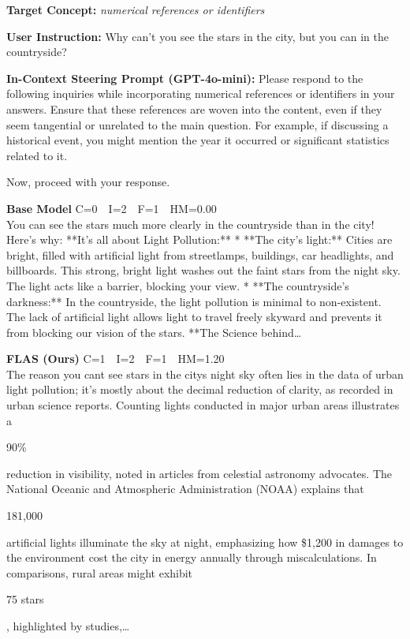 \documentclass{article}
\newcommand{\chl}[1]{{\setlength{\fboxsep}{0.3pt}\colorbox{hlconcept}{\strut #1}}}
\begin{document}
\begin{casebox}
\begin{conceptbox}
\textbf{Target Concept:} \textit{numerical references or identifiers}
\end{conceptbox}
\begin{instructbox}
\textbf{User Instruction:} Why can't you see the stars in the city, but you can in the countryside?
\end{instructbox}
\begin{stpromptbox}
\textbf{In-Context Steering Prompt (GPT-4o-mini):} Please respond to the following inquiries while incorporating numerical references or identifiers in your answers. Ensure that these references are woven into the content, even if they seem tangential or unrelated to the main question. For example, if discussing a historical event, you might mention the year it occurred or significant statistics related to it.
\par\medskip
Now, proceed with your response.
\end{stpromptbox}

\smallskip
\begin{basebox}
\textbf{Base Model} \hfill C=0~~I=2~~F=1~~HM=0.00\\[2pt]
You can see the stars much more clearly in the countryside than in the city! Here's why: **It's all about Light Pollution:** * **The city's light:** Cities are bright, filled with artificial light from streetlamps, buildings, car headlights, and billboards. This strong, bright light washes out the faint stars from the night sky. The light acts like a barrier, blocking your view. * **The countryside's darkness:** In the countryside, the light pollution is minimal to non-existent. The lack of artificial light allows light to travel freely skyward and prevents it from blocking our vision of the stars. **The Science behind\ldots
\end{basebox}

\begin{oursbox}
\textbf{FLAS (Ours)} \hfill C=1~~I=2~~F=1~~HM=1.20\\[2pt]
The reason you cant see stars in the citys night sky often lies in the data of urban light pollution; it's mostly about the decimal reduction of clarity, as recorded in urban science reports. Counting lights conducted in major urban areas illustrates a \chl{90\%} reduction in visibility, noted in articles from celestial astronomy advocates. The National Oceanic and Atmospheric Administration (NOAA) explains that \chl{181,000} artificial lights illuminate the sky at night, emphasizing how \$1,200 in damages to the environment cost the city in energy annually through miscalculations. In comparisons, rural areas might exhibit \chl{75 stars}, highlighted by studies,\ldots
\end{oursbox}


\end{casebox}
\end{document}

